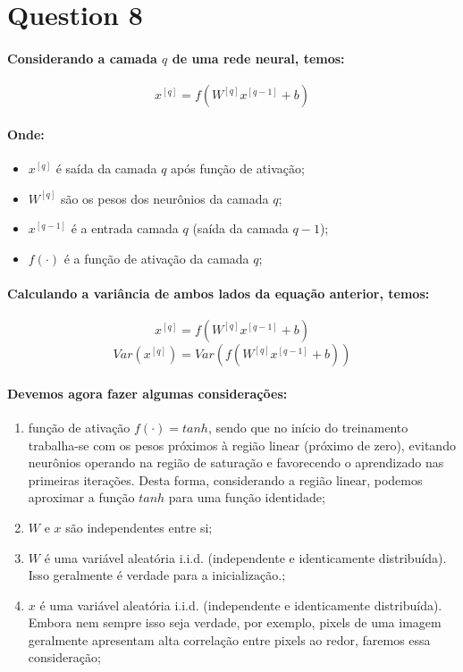 \documentclass[a4paper]{article}    %
\begin{document}
\newpage
\section*{Question 8}

\paragraph{Considerando a camada $q$ de uma rede neural, temos:}
\[x^{[q]} = f(W^{[q]} x^{[q-1]} + b)\]

\paragraph{Onde:}
\begin{itemize}
    \item $x^{[q]}$ é saída da camada $q$ após função de ativação;
    \item $W^{[q]}$ são os pesos dos neurônios da camada $q$;
    \item $x^{[q-1]}$ é a entrada camada $q$ (saída da camada $q-1$);
    \item $f(\cdot)$ é a função de ativação da camada $q$;
\end{itemize}

\paragraph{Calculando a variância de ambos lados da equação anterior, temos:}

\[x^{[q]} = f(W^{[q]} x^{[q-1]} + b)\]
\[Var(x^{[q]}) = Var(f(W^{[q]} x^{[q-1]} + b))\]

\paragraph{Devemos agora fazer algumas considerações:}
\begin{enumerate}[label=(\roman*)]
    \item função de ativação $f(\cdot) = tanh$, sendo que no início do treinamento trabalha-se com os pesos próximos à região linear (próximo de zero), evitando neurônios operando na região de saturação e favorecendo o aprendizado nas primeiras iterações. Desta forma, considerando a região linear, podemos aproximar a função $tanh$ para uma função identidade;
    \item $W$ e $x$ são independentes entre si;
    \item $W$ é uma variável aleatória i.i.d. (independente e identicamente distribuída). Isso geralmente é verdade para a inicialização.;
    \item $x$ é uma variável aleatória i.i.d. (independente e identicamente distribuída). Embora nem sempre isso seja verdade, por exemplo, pixels de uma imagem geralmente apresentam alta correlação entre pixels ao redor, faremos essa consideração;
\end{enumerate}
\end{document}
